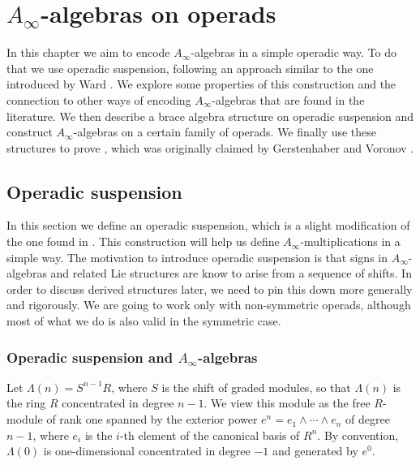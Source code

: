 \documentclass[Thesis.tex]{subfiles}
\begin{document}
\chapter{$A_\infty$-algebras on operads}\label{Sec2}

In this chapter we aim to encode $A_\infty$-algebras in a simple operadic way. To do that we use operadic suspension, following an approach similar to the one introduced by Ward \cite{ward}. We explore some properties of this construction and the connection to other ways of encoding $A_\infty$-algebras that are found in the literature. We then describe a brace algebra structure on operadic suspension and construct $A_\infty$-algebras on a certain family of operads. We finally use these structures to prove , which was originally claimed by Gerstenhaber and Voronov \cite{GV}.

\section{Operadic suspension}

In this section we define an operadic suspension, which is a slight modification of the one found in \cite{ward}. This construction will help us define $A_\infty$-multiplications in a simple way. The motivation to introduce operadic suspension is that signs in $A_\infty$-algebras and related Lie structures are know to arise from a sequence of shifts. In order to discuss derived structures later, we need to pin this down more generally and rigorously. We are going to work only with non-symmetric operads, although most of what we do is also valid in the symmetric case.

\subsection{Operadic suspension and $A_\infty$-algebras}
Let $\Lambda(n)=S^{n-1}R$, where $S$ is the shift of graded modules, so that $\Lambda(n)$ is the ring $R$ concentrated in degree $n-1$. We view this module as the free $R$-module of rank one spanned by the exterior power $e^n=e_1\land\cdots\land e_n$ of degree $n-1$, where $e_i$ is the $i$-th element of the canonical basis of $R^n$. By convention, $\Lambda(0)$ is one-dimensional concentrated in degree $-1$ and generated by $e^0$.
\end{document}
